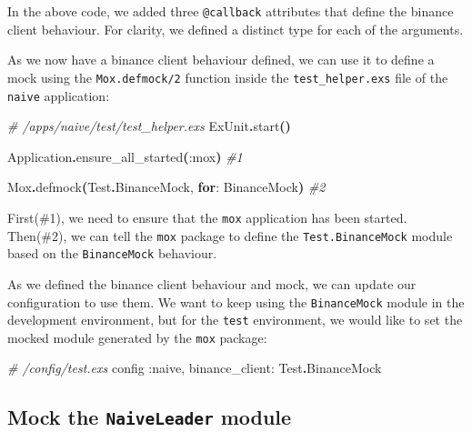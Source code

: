 \documentclass[
  oneside]{book}
\newenvironment{Shaded}{\begin{snugshade}}{\end{snugshade}}
\newcommand{\CommentTok}[1]{\textcolor[rgb]{0.56,0.35,0.01}{\textit{#1}}}
\newcommand{\ConstantTok}[1]{\textcolor[rgb]{0.56,0.35,0.01}{#1}}
\newcommand{\FunctionTok}[1]{\textcolor[rgb]{0.13,0.29,0.53}{\textbf{#1}}}
\newcommand{\KeywordTok}[1]{\textcolor[rgb]{0.13,0.29,0.53}{\textbf{#1}}}
\newcommand{\NormalTok}[1]{#1}
\newcommand{\OperatorTok}[1]{\textcolor[rgb]{0.81,0.36,0.00}{\textbf{#1}}}
\newcommand{\VariableTok}[1]{\textcolor[rgb]{0.00,0.00,0.00}{#1}}
\begin{document}
In the above code, we added three \texttt{@callback} attributes that define the binance client behaviour. For clarity, we defined a distinct type for each of the arguments.

As we now have a binance client behaviour defined, we can use it to define a mock using the \texttt{Mox.defmock/2} function inside the \texttt{test\_helper.exs} file of the \texttt{naive} application:

\begin{Shaded}
\begin{Highlighting}[]
\CommentTok{\# /apps/naive/test/test\_helper.exs}
\ConstantTok{ExUnit}\OperatorTok{.}\NormalTok{start}\FunctionTok{()}

\ConstantTok{Application}\OperatorTok{.}\NormalTok{ensure\_all\_started}\FunctionTok{(}\VariableTok{:mox}\FunctionTok{)} \CommentTok{\#1}

\ConstantTok{Mox}\OperatorTok{.}\NormalTok{defmock}\FunctionTok{(}\ConstantTok{Test}\OperatorTok{.}\ConstantTok{BinanceMock}\NormalTok{, }\KeywordTok{for}\NormalTok{: }\ConstantTok{BinanceMock}\FunctionTok{)} \CommentTok{\#2}
\end{Highlighting}
\end{Shaded}

First(\#1), we need to ensure that the \texttt{mox} application has been started. Then(\#2), we can tell the \texttt{mox} package to define the \texttt{Test.BinanceMock} module based on the \texttt{BinanceMock} behaviour.

As we defined the binance client behaviour and mock, we can update our configuration to use them. We want to keep using the \texttt{BinanceMock} module in the development environment, but for the \texttt{test} environment, we would like to set the mocked module generated by the \texttt{mox} package:

\begin{Shaded}
\begin{Highlighting}[]
\CommentTok{\# /config/test.exs}
\NormalTok{config }\VariableTok{:naive}\NormalTok{,}
  \VariableTok{binance\_client:} \ConstantTok{Test}\OperatorTok{.}\ConstantTok{BinanceMock}
\end{Highlighting}
\end{Shaded}

\subsection{\texorpdfstring{Mock the \texttt{NaiveLeader} module}{Mock the NaiveLeader module}}\label{mock-the-naiveleader-module}
\end{document}
